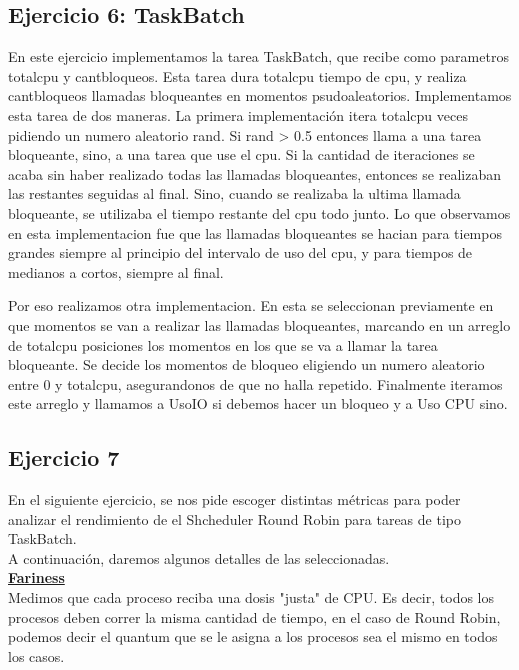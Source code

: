 \subsection{Ejercicio 6: TaskBatch}

En este ejercicio implementamos la tarea TaskBatch, que recibe como parametros totalcpu y cantbloqueos. Esta tarea dura totalcpu tiempo de 
cpu, y realiza cantbloqueos llamadas bloqueantes en momentos psudoaleatorios. Implementamos esta tarea de dos maneras. La primera implementaci\'on itera totalcpu
veces pidiendo un numero aleatorio rand. Si rand > 0.5 entonces llama a una tarea bloqueante, sino, a una tarea que use el cpu. Si la cantidad 
de iteraciones se acaba sin haber realizado todas las llamadas bloqueantes, entonces se realizaban las restantes seguidas al final. Sino, cuando se realizaba
la ultima llamada bloqueante, se utilizaba el tiempo restante del cpu todo junto. Lo que observamos en esta implementacion fue que las llamadas bloqueantes
se hacian para tiempos grandes siempre al principio del intervalo de uso del cpu, y para tiempos de medianos a cortos, siempre al final.

Por eso realizamos otra implementacion. En esta se seleccionan previamente en que momentos se van a realizar las llamadas bloqueantes, marcando en un arreglo de totalcpu posiciones los momentos en los que se va
a llamar la tarea bloqueante. Se decide los momentos de bloqueo eligiendo un numero aleatorio entre 0 y totalcpu, asegurandonos de que no halla repetido. 
Finalmente iteramos este arreglo y llamamos a UsoIO si debemos hacer un bloqueo y a Uso CPU sino.


\subsection{Ejercicio 7}
En el siguiente ejercicio, se nos pide escoger distintas m\'etricas para poder analizar el rendimiento de el Shcheduler Round Robin para tareas de tipo TaskBatch.\\
A continuaci\'on, daremos algunos detalles de las seleccionadas.\\

\textbf{\underline{Fariness}}\\
Medimos que cada proceso reciba una dosis "justa" de CPU. Es decir, todos los procesos deben correr la misma cantidad de tiempo, en el caso de Round Robin, podemos decir el quantum que se le asigna a los procesos sea el mismo en todos los casos.\\

